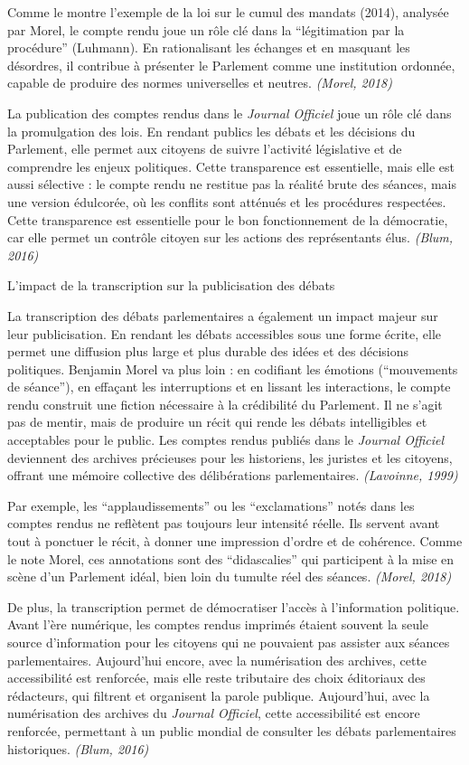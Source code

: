 Comme le montre l’exemple de la loi sur le cumul des mandats (2014), analysée par Morel, le compte rendu joue un rôle clé dans la \enquote{légitimation par la procédure} (Luhmann). En rationalisant les échanges et en masquant les désordres, il contribue à présenter le Parlement comme une institution ordonnée, capable de produire des normes universelles et neutres. \emph{(Morel, 2018)}

La publication des comptes rendus dans le \emph{Journal Officiel} joue un rôle clé dans la promulgation des lois. En rendant publics les débats et les décisions du Parlement, elle permet aux citoyens de suivre l'activité législative et de comprendre les enjeux politiques. Cette transparence est essentielle, mais elle est aussi sélective : le compte rendu ne restitue pas la réalité brute des séances, mais une version édulcorée, où les conflits sont atténués et les procédures respectées. Cette transparence est essentielle pour le bon fonctionnement de la démocratie, car elle permet un contrôle citoyen sur les actions des représentants élus. \emph{(Blum, 2016)}

 L'impact de la transcription sur la publicisation des débats

La transcription des débats parlementaires a également un impact majeur sur leur publicisation. En rendant les débats accessibles sous une forme écrite, elle permet une diffusion plus large et plus durable des idées et des décisions politiques. Benjamin Morel va plus loin : en codifiant les émotions (\enquote{mouvements de séance}), en effaçant les interruptions et en lissant les interactions, le compte rendu construit une fiction nécessaire à la crédibilité du Parlement. Il ne s’agit pas de mentir, mais de produire un récit qui rende les débats intelligibles et acceptables pour le public. Les comptes rendus publiés dans le \emph{Journal Officiel} deviennent des archives précieuses pour les historiens, les juristes et les citoyens, offrant une mémoire collective des délibérations parlementaires. \emph{(Lavoinne, 1999)}

Par exemple, les \enquote{applaudissements} ou les \enquote{exclamations} notés dans les comptes rendus ne reflètent pas toujours leur intensité réelle. Ils servent avant tout à ponctuer le récit, à donner une impression d’ordre et de cohérence. Comme le note Morel, ces annotations sont des \enquote{didascalies} qui participent à la mise en scène d’un Parlement idéal, bien loin du tumulte réel des séances. \emph{(Morel, 2018)}

De plus, la transcription permet de démocratiser l'accès à l'information politique. Avant l'ère numérique, les comptes rendus imprimés étaient souvent la seule source d'information pour les citoyens qui ne pouvaient pas assister aux séances parlementaires. Aujourd’hui encore, avec la numérisation des archives, cette accessibilité est renforcée, mais elle reste tributaire des choix éditoriaux des rédacteurs, qui filtrent et organisent la parole publique. Aujourd'hui, avec la numérisation des archives du \emph{Journal Officiel}, cette accessibilité est encore renforcée, permettant à un public mondial de consulter les débats parlementaires historiques. \emph{(Blum, 2016)}

